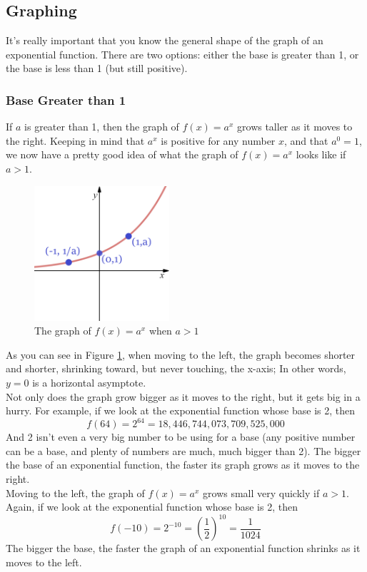 \subsection{Graphing}
It’s really important that you know the general shape of the graph of an exponential function.
There are two options: either the base is greater than 1, or the base is less than 1 (but still
positive).

\subsubsection{Base Greater than 1}
If $a$ is greater than 1, then the graph of $f(x)=a^x$ grows taller as it moves to the right.
Keeping in mind that $a^x$ is positive for any number $x$, and that $a^0  = 1$, we now have a
pretty good idea of what the graph of $f(x) = a^x$ looks like if $a > 1$.
		\begin{figure}[H]
		 \includegraphics[width=5cm]{pics/a_gt_1.png}
		 \centering
		 \caption{The graph of $f(x)=a^x$ when $a>1$}
		 \label{fig:greater_than_one}
		\end{figure}
As you can see in Figure \ref{fig:greater_than_one}, when moving to the left, the graph becomes shorter and shorter,
shrinking toward, but never touching, the x-axis; In other words, $y=0$ is a horizontal
asymptote. \\
Not only does the graph grow bigger as it moves to the right, but it gets big in a hurry. For
example, if we look at the exponential function whose base is 2, then 
				\[
				f(64)=2^{64}=18,446,744,073,709,525,000
				\]
And 2 isn’t even a very big number to be using for a base (any positive number can be a base, and
plenty of numbers are much, much bigger than 2). The bigger the base of an exponential function,
the faster its graph grows as it moves to the right.\\Moving to the left, the graph of $f(x) = a^x$ grows small very quickly if $a > 1$. Again, if we
look at the exponential function whose base is 2, then
				\[
				f(-10)=2^{-10}=\left(\frac{1}{2} \right)^{10} =\frac{1}{1024}
				\]
The bigger the base, the faster the graph of an exponential function shrinks as it moves to the
left.
